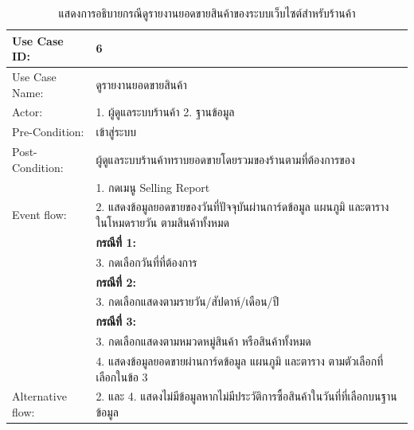 \begin{table}[htbp]
  \centering
  \caption{แสดงการอธิบายกรณีดูรายงานยอดขายสินค้าของระบบเว็บไซต์สำหรับร้านค้า}
  \label{tab:example}
  \begin{tabularx}{\textwidth}{|p{3cm}|X|}
      \hline
      \multirow{1}{3cm}{Use Case ID:} & 6 \\
      \hline
      \multirow{1}{3cm}{Use Case Name:} & ดูรายงานยอดขายสินค้า \\
      \hline
      \multirow{1}{3cm}{Actor:} & 1. ผู้ดูแลระบบร้านค้า  2. ฐานข้อมูล \\
      \hline
      \multirow{1}{3cm}{Pre-Condition:} & เข้าสู่ระบบ \\
      \hline
      \multirow{1}{3cm}{Post-Condition:} & ผู้ดูแลระบบร้านค้าทราบยอดขายโดยรวมของร้านตามที่ต้องการของ \\
      \hline
      \multirow{3}{3cm}{Event flow:} & 1. กดเมนู Selling Report  \\ 
      & 2. แสดงข้อมูลยอดขายของวันที่ปัจจุบันผ่านการ์ดข้อมูล แผนภูมิ และตาราง ในโหมดรายวัน ตามสินค้าทั้งหมด \\
      & \textbf{กรณีที่ 1:} \\ & 3. กดเลือกวันที่ที่ต้องการ \\
      & \textbf{กรณีที่ 2:} \\ & 3. กดเลือกแสดงตามรายวัน/สัปดาห์/เดือน/ปี \\
      & \textbf{กรณีที่ 3:} \\ & 3. กดเลือกแสดงตามหมวดหมู่สินค้า หรือสินค้าทั้งหมด \\
      & 4. แสดงข้อมูลยอดขายผ่านการ์ดข้อมูล แผนภูมิ และตาราง ตามตัวเลือกที่เลือกในข้อ 3 \\
      \hline
      \multirow{1}{3cm}{Alternative flow:} & 2. และ 4. แสดงไม่มีข้อมูลหากไม่มีประวัติการซื้อสินค้าในวันที่ที่เลือกบนฐานข้อมูล \\
      \hline
  \end{tabularx}
\end{table}

